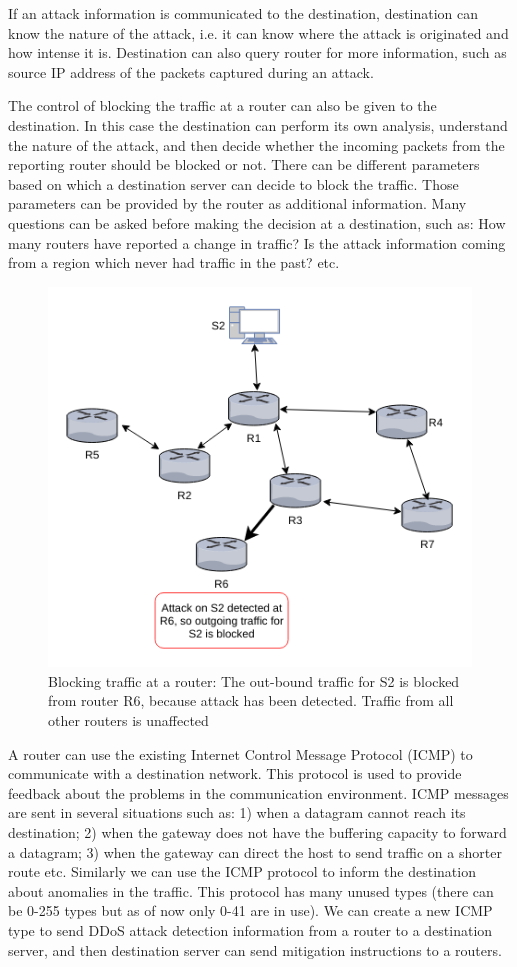 \documentclass[12pt,oneside,a4paper]{article}
\begin{document}
If an attack information is communicated to the destination, destination can know the nature of the attack, i.e. it can know where the attack is originated and how intense it is. Destination can also query router for more information, such as source IP address of the packets captured during an attack.

The control of blocking the traffic at a router can also be given to the destination. In this case the destination can perform its own analysis, understand the nature of the attack, and then decide whether the incoming packets from the reporting router should be blocked or not. There can be different parameters based on which a destination server can decide to block the traffic. Those parameters can be provided by the router as additional information. Many questions can be asked before making the decision at a destination, such as: How many routers have reported a change in traffic? Is the attack information coming from a region which never had traffic in the past? etc.

\begin{figure}[H]
\centering
\includegraphics[scale=0.60]{mitigation_path.png}
\caption{Blocking traffic at a router: The out-bound traffic for S2 is blocked from router R6,
because attack has been detected. Traffic from all other routers is unaffected} \label{fig:mitigation_path}
\end{figure}

A router can use the existing Internet Control Message Protocol (ICMP) to communicate with a destination network. This protocol is used to provide feedback about the problems in the communication environment. ICMP messages are sent in several situations such as: 1) when a datagram cannot reach its destination; 2) when the gateway does not have the buffering capacity to forward a datagram; 3) when the gateway can direct the host to send traffic on a shorter route etc.\cite{icmp} Similarly we can use the ICMP protocol to inform the destination about anomalies in the traffic. This protocol has many unused types (there can be 0-255 types but as of now only 0-41 are in use). We can create a new ICMP type to send DDoS attack detection information from a router to a destination server, and then destination server can send mitigation instructions to a routers.
\end{document}
